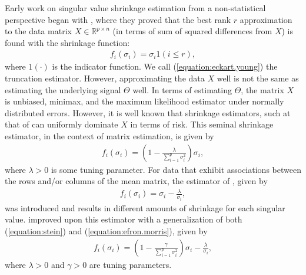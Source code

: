 Early work on singular value shrinkage estimation from a
non-statistical perspective began with \cite{eckart1936approximation},
where they proved that the best rank $r$ approximation to the data
matrix $X \in \mathbb{R}^{p \times n}$ (in terms of sum of squared
differences from $X$) is found with the shrinkage function:
\begin{align}
  \label{equation:eckart.young}
  f_i(\sigma_i) = \sigma_i 1(i \leq r),
\end{align}
where $1(\cdot)$ is the indicator function. We call
(\ref{equation:eckart.young}) the truncation estimator. However,
approximating the data $X$ well is not the same as estimating the
underlying signal $\Theta$ well. In terms of estimating $\Theta$, the
matrix $X$ is unbiased, minimax, and the maximum likelihood estimator
under normally distributed errors. However, it is well known that
shrinkage estimators, such at that of \cite{stein1981estimation} can
uniformly dominate $X$ in terms of risk. This seminal shrinkage
estimator, in the context of matrix estimation, is given by
\begin{align}
  \label{equation:stein}
  f_i(\sigma_i) = \left(1 - \frac{\lambda}{\sum_{i = 1}^p\sigma_i^2}\right)\sigma_i,
\end{align}
where $\lambda > 0$ is some tuning parameter. For data that exhibit
associations between the rows and/or columns of the mean matrix, the
estimator of \cite{efron1972empirical}, given by
\begin{align}
  \label{equation:efron.morris}
  f_i(\sigma_i) = \sigma_i - \frac{\lambda}{\sigma_i},
\end{align}
was introduced and results in different amounts of shrinkage for each
singular value.  \cite{efron1976multivariate} improved upon this
estimator with a generalization of both (\ref{equation:stein}) and
(\ref{equation:efron.morris}), given by
\begin{align}
  \label{equation:improved.em}
  f_i(\sigma_i) = \left(1 - \frac{\gamma}{\sum_{i = 1}^p\sigma_i^2}\right)\sigma_i - \frac{\lambda}{\sigma_i},
\end{align}
where $\lambda > 0$ and $\gamma > 0$ are tuning parameters.

